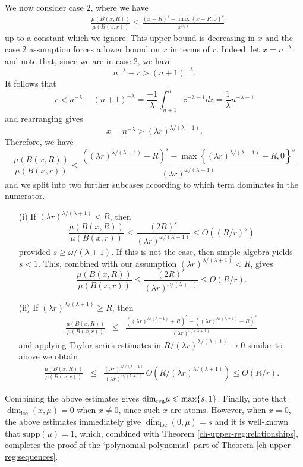 We now consider case 2, where we have
\begin{align*}
&\frac{\mu(B(x,R))}{\mu(B(x,r))} \le \frac{(x+R)^{s}-\max\left\{x-R,0\right\}^{s}}{x^{\omega/\lambda}}
\end{align*}
up to a constant which we ignore.  This upper bound is decreasing in $x$ and the case 2 assumption forces a lower bound on $x$ in terms of $r$.  Indeed, let $x=n^{-\lambda}$ and note that, since we are in case 2, we have
\[
n^{-\lambda}-  r > (n+1)^{-\lambda}.
\]
It follows that 
\[
r<  n^{-\lambda}- (n+1)^{-\lambda} =  \frac{-1}{\lambda}\int_{n+1}^n z^{-\lambda-1}dz = \frac{1}{\lambda} n^{-\lambda-1}
\]
and rearranging gives
\[
x= n^{-\lambda} > (\lambda r )^{\lambda/(\lambda +1)}.
\]
Therefore, we have
\[
\frac{\mu(B(x,R))}{\mu(B(x,r))} \le   \frac{((\lambda r )^{\lambda/(\lambda +1)}+R)^{s}-\max\left\{(\lambda r )^{\lambda/(\lambda +1)}-R,0\right\}^{s}}{(\lambda r )^{\omega/(\lambda +1)}}
\]
and we split into two further subcases according to which term dominates in the numerator.
\begin{enumerate}
	\item[(i)] If $(\lambda r)^{\lambda/(\lambda+1)}<R$, then
	\[
	\frac{\mu(B(x,R))}{\mu(B(x,r))} \le \frac{(2R)^{s} }{ (\lambda r )^{\omega/(\lambda +1)}}  \le O \left( (R/r)^s \right)
	\]
	provided $s \geq \omega/(\lambda +1)$.  If this is not the case, then simple algebra yields $s < 1$.  This, combined with our assumption  $(\lambda r)^{\lambda/(\lambda+1)}<R$, gives
	\[
	\frac{\mu(B(x,R))}{\mu(B(x,r))} \le \frac{(2R)^{s} }{ (\lambda r )^{\omega/(\lambda +1)}}  \le O \left( R/r \right).
	\]
	\item[(ii)] If $(\lambda r)^{\lambda/(\lambda+1)} \geq R$, then 
	\begin{eqnarray*}
		\frac{\mu(B(x,R))}{\mu(B(x,r))} &\le& \frac{((\lambda r )^{\lambda/(\lambda +1)}+R)^{s}- ((\lambda r )^{\lambda/(\lambda +1)}-R)^{s}}{(\lambda r )^{\omega/(\lambda +1)}} 
	\end{eqnarray*}
	and applying Taylor series estimates in $R/(\lambda r)^{\lambda/(\lambda+1)} \to 0$ similar to above we obtain
	\begin{eqnarray*}
		\frac{\mu(B(x,R))}{\mu(B(x,r))} &\le& \frac{(\lambda r)^{s\lambda/(\lambda+1)}}{(\lambda r )^{\omega/(\lambda +1)}} \, O \left( R/(\lambda r)^{\lambda/(\lambda+1)} \right) \le O \left( R/r \right).
	\end{eqnarray*}
\end{enumerate}


Combining the above estimates gives $\overline{\dim}_{\textup{reg}} \mu\leqslant\max \{s,1\}$.  Finally, note that $\overline{\dim}_{\text{loc}}(x,\mu)=0$ when $x\neq 0$, since such $x$ are atoms.  However, when $x=0$, the above estimates  immediately give $\overline{\dim}_{\text{loc}}(0,\mu)= s$ and it is well-known that $\text{supp}(\mu) = 1$, which, combined with Theorem \ref{ch-upper-reg:relationships}, completes the proof of the `polynomial-polynomial' part of Theorem \ref{ch-upper-reg:sequences}.


